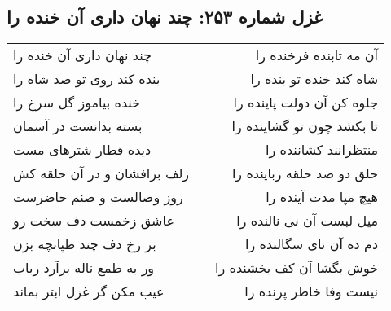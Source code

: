 \begin{center}
\section*{غزل شماره ۲۵۳: چند نهان داری آن خنده را}
\label{sec:0253}
\begin{longtable}{l p{0.5cm} r}
چند نهان داری آن خنده را
&&
آن مه تابنده فرخنده را
\\
بنده کند روی تو صد شاه را
&&
شاه کند خنده تو بنده را
\\
خنده بیاموز گل سرخ را
&&
جلوه کن آن دولت پاینده را
\\
بسته بدانست در آسمان
&&
تا بکشد چون تو گشاینده را
\\
دیده قطار شترهای مست
&&
منتظرانند کشاننده را
\\
زلف برافشان و در آن حلقه کش
&&
حلق دو صد حلقه رباینده را
\\
روز وصالست و صنم حاضرست
&&
هیچ مپا مدت آینده را
\\
عاشق زخمست دف سخت رو
&&
میل لبست آن نی نالنده را
\\
بر رخ دف چند طپانچه بزن
&&
دم ده آن نای سگالنده را
\\
ور به طمع ناله برآرد رباب
&&
خوش بگشا آن کف بخشنده را
\\
عیب مکن گر غزل ابتر بماند
&&
نیست وفا خاطر پرنده را
\\
\end{longtable}
\end{center}
